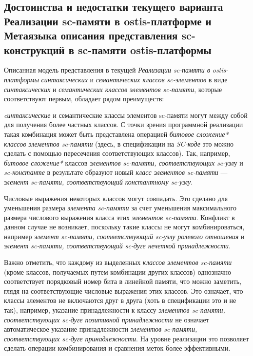 \subsection{Достоинства и недостатки текущего варианта Реализации sc-памяти в ostis-платформе и Метаязыка описания представления sc-конструкций в sc-памяти ostis-платформы}
\label{sec_soft_platform_scin_code_problems}

Описанная модель представления в текущей \textit{Реализации sc-памяти в ostis-платформы} \textit{синтаксических} и \textit{семантических классов sc-элементов} в виде \textit{синтаксических} и \textit{семантических классов элементов sc-памяти\scnsupergroupsign}, которые соответствуют первым, обладает рядом преимуществ:
\begin{textitemize}
	\item \textit{cинтаксические} и {семантические классы элементов sc-памяти\scnsupergroupsign} могут  между собой для получения более частных классов. С точки зрения программной реализации такая комбинация может быть представлена операцией \textit{битовое сложение*} \textit{классов элементов sc-памяти\scnsupergroupsign} (здесь, в спецификации на \textit{SC-коде} это можно сделать с помощью пересечения соответствующих классов). Так, например, \textit{битовое сложение*} классов \textit{элементов sc-памяти, соответствующих sc-узл}у и \textit{sc-константе} в результате образуют новый \textit{класс элементов sc-памяти\scnsupergroupsign} --- \textit{элемент sc-памяти, соответствующий константному sc-узлу}.
	\item Числовые выражения некоторых классов могут совпадать. Это сделано для уменьшения размера \textit{элемента sc-памяти} за счет уменьшения максимального размера числового выражения класса этих \textit{элементов sc-памяти}. Конфликт в данном случае не возникает, поскольку такие классы не могут комбинироваться, например \textit{элемент sc-памяти, соответствующий sc-узлу ролевого отношения} и \textit{элемент sc-памяти, соответствующий sc-дуге нечеткой принадлежности}.
	\item Важно отметить, что каждому из выделенных \textit{классов элементов sc-памяти} (кроме классов, получаемых путем комбинации других классов) однозначно соответствует порядковый номер бита в линейной памяти, что можно заметить, глядя на соответствующие числовые выражения этих классов. Это означает, что классы элементов не включаются друг в друга (хоть в спецификации это и не так), например, указание принадлежности к классу \textit{элементов sc-памяти, соответствующих sc-дуге позитивной принадлежности} не означает автоматическое указание принадлежности \textit{элементов sc-памяти, соответствующих sc-дуге принадлежности}. На уровне реализации это позволяет сделать операции комбинирования и сравнения меток более эффективными.
\end{textitemize}

